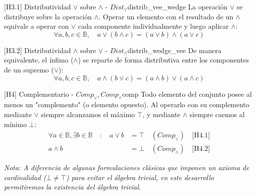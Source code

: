 \begin{postulado}{[H3.1] Distributividad $\vee$ sobre $\wedge$ - $Dist_\vee$}{distrib_vee_wedge}
La operación $\vee$ se distribuye sobre la operación $\wedge$. Operar un elemento con el resultado de un $\wedge$ equivale a operar con $\vee$ cada componente individualmente y luego aplicar $\wedge$:
\[ \forall a, b, c \in \mathbb{B}, \quad a \vee (b \wedge c) = (a \vee b) \wedge (a \vee c) \]
\end{postulado}

\begin{postulado}{[H3.2] Distributividad $\wedge$ sobre $\vee$ - $Dist_\wedge$}{distrib_wedge_vee}
De manera equivalente, el ínfimo ($\wedge$) se reparte de forma distributiva entre los componentes de un supremo ($\vee$):
\[ \forall a, b, c \in \mathbb{B}, \quad a \wedge (b \vee c) = (a \wedge b) \vee (a \wedge c) \]
\end{postulado}

\begin{postulado}{[H4] Complementario - $Comp_\vee, Comp_\wedge$}{comp}
Todo elemento del conjunto posee al menos un "complemento" (o elemento opuesto). Al operarlo con su complemento mediante $\vee$ siempre alcanzamos el máximo $\top$, y mediante $\wedge$ siempre caemos al mínimo $\bot$:
\begin{align*}
\forall a \in \mathbb{B}, \exists b \in \mathbb{B} \quad : \quad a \vee b &= \top \quad (Comp_\vee) \quad \text{[H4.1]} \\
a \wedge b &= \bot \quad (Comp_\wedge) \quad \text{[H4.2]}
\end{align*}
\end{postulado}

\textit{Nota: A diferencia de algunas formulaciones clásicas que imponen un axioma de cardinalidad ($\bot \neq \top$) para evitar el álgebra trivial, en este desarrollo permitiremos la existencia del álgebra trivial.}

